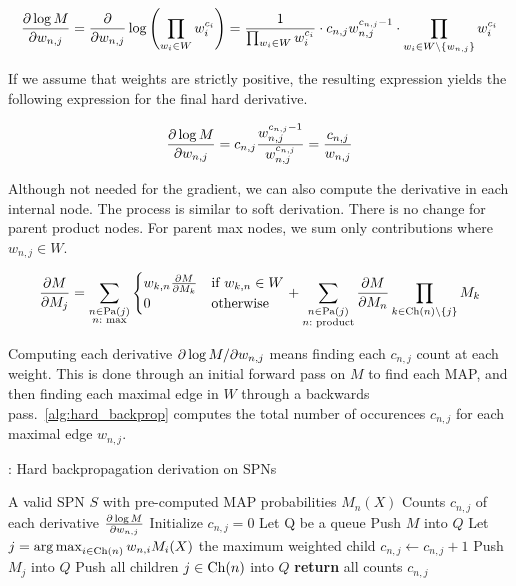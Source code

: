 \begin{equation*}
  \frac{\partial\log M}{\partial w_{n,j}}=\frac{\partial}{\partial w_{n,j}}\log\left(\prod_{w_i\in W}w_i^{c_i}\right)=
    \frac{1}{\prod_{w_i\in W}w_i^{c_i}}\cdot c_{n,j}w_{n,j}^{c_{n,j}-1}\cdot\prod_{w_i\in
      W\setminus\{w_{n,j}\}}w_i^{c_i}
\end{equation*}

If we assume that weights are strictly positive, the resulting expression yields the following
expression for the final hard derivative.

\begin{equation}
  \frac{\partial\log M}{\partial w_{n,j}}=c_{n,j}\frac{w_{n,j}^{c_{n,j}-1}}{w_{n,j}^{c_{n,j}}}=
    \frac{c_{n,j}}{w_{n,j}}\label{eq:hard_weight_derivative}
\end{equation}

Although not needed for the gradient, we can also compute the derivative in each internal node. The
process is similar to soft derivation. There is no change for parent product nodes. For parent max
nodes, we sum only contributions where $w_{n,j}\in W$.

\begin{equation}
  \frac{\partial M}{\partial M_j}=\sum_{\substack{n\in\operatorname*{\text{Pa}}(j)\\n:\text{ max}}}
    \begin{cases}
      w_{k,n}\frac{\partial M}{\partial M_k} & \text{if $w_{k,n}\in W$}\\
      0 & \text{otherwise}
    \end{cases}
    + \sum_{\substack{n\in\operatorname*{\text{Pa}}(j)\\n:\text{ product}}}\frac{\partial M}{\partial M_n}\prod_{k\in\operatorname*{\text{Ch}}(n)\setminus\{j\}}M_k
\end{equation}

Computing each derivative $\partial\log M/\partial w_{n,j}$ means finding each $c_{n,j}$ count at each
weight. This is done through an initial forward pass on $M$ to find each MAP, and then finding each
maximal edge in $W$ through a backwards pass.~\autoref{alg:hard_backprop} computes the total number
of occurences $c_{n,j}$ for each maximal edge $w_{n,j}$.

\begin{algorithm}[H]
  \caption{: Hard backpropagation derivation on SPNs\label{alg:hard_backprop}}
  \begin{algorithmic}[1]
    \Require A valid SPN $S$ with pre-computed MAP probabilities $M_n(X)$
    \Ensure Counts $c_{n,j}$ of each derivative $\frac{\partial\log M}{\partial w_{n,j}}$
    \State Initialize $c_{n,j}=0$
    \State Let Q be a queue
    \State Push $M$ into $Q$
        \State Let $j=\operatorname*{arg\,max}_{i\in\operatorname*{\text{Ch}}(n)}w_{n,i}M_{i}(X)$ the maximum weighted child
        \State $c_{n,j}\gets c_{n,j}+1$
        \State Push $M_j$ into $Q$
        \State Push all children $j\in\operatorname*{\text{Ch}}(n)$ into $Q$
      \EndIf
    \EndFor%
    \State \textbf{return} all counts $c_{n,j}$
  \end{algorithmic}
\end{algorithm}

